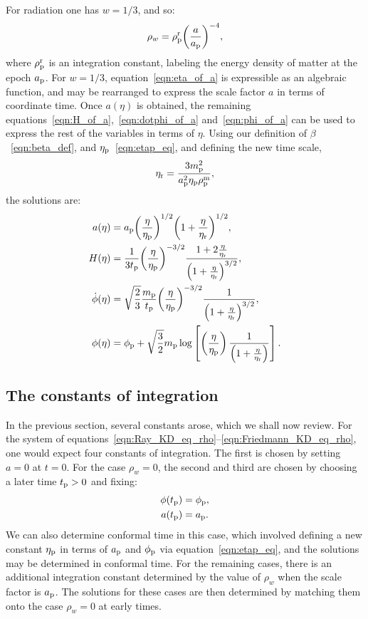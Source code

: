 For radiation one has \(w=1/3\), and so:
%
\begin{equation}
  \rho_w = \rho_{\mathrm{p}}^{\mathrm{r}}{\left(\frac{a}{a_{\mathrm{p}}}\right)}^{-4},
\end{equation}
%
where \(\rho_{\mathrm{p}}^{\mathrm{r}}\) is an integration constant, labeling the energy density of matter at the epoch \(a_{\mathrm{p}}\).  For \(w=1/3\), equation~\eqref{eqn:eta_of_a} is expressible as an algebraic function, and may be rearranged to express the scale factor \(a\) in terms of coordinate time. Once \(a(\eta)\) is obtained, the remaining equations~\eqref{eqn:H_of_a},~\eqref{eqn:dotphi_of_a} and~\eqref{eqn:phi_of_a} can be used to express the rest of the variables in terms of \(\eta\). Using our definition of \(\beta\)~\eqref{eqn:beta_def}, and \(\eta_{\mathrm{p}}\)~\eqref{eqn:etap_eq}, and defining the new time scale,
%
\begin{equation}
  \eta_{\mathrm{r}} = \frac{3m_{\mathrm{p}}^2}{a_{\mathrm{p}}^2\eta_{\mathrm{p}}\rho_{\mathrm{p}}^{\mathrm{m}}},
  \label{eqn:etar}
\end{equation}
%
the solutions are:
%
\begin{align}
  a(\eta)
  &=
  a_{\mathrm{p}}{\left(\frac{\eta}{\eta_{\mathrm{p}}}\right)}^{1/2}
  {\left({1+\frac{\eta}{\eta_{\mathrm{r}}}}\right)}^{1/2},
  \\
  H(\eta) 
  &= 
  \frac{1}{3t_{\mathrm{p}}}{\left(\frac{\eta}{\eta_{\mathrm{p}}}\right)}^{-3/2}
  \frac{1+ 2\frac{\eta}{\eta_{\mathrm{r}}}}
  {{\left(1+ \frac{\eta}{\eta_{\mathrm{r}}}\right)}^{3/2}},
  \\
  \dot{\phi}(\eta) 
  &=
  \sqrt{\frac{2}{3}}\frac{m_{\mathrm{p}}}{t_{\mathrm{p}}}
  {\left(\frac{\eta}{\eta_{\mathrm{p}}}\right)}^{-3/2}
  \frac{1}{{\left(1+ \frac{\eta}{\eta_{\mathrm{r}}}\right)}^{3/2}},
  \\ 
  \phi(\eta) 
  &=
  \phi_{\mathrm{p}}+\sqrt {\frac{3}{2}}m_{\mathrm{p}}\log  
  \left[
  \left(\frac{\eta}{\eta_{\mathrm{p}}}\right)
  \frac {1}{\left(1+ \frac{\eta}{\eta_{\mathrm{r}}}\right)} 
  \right].
\end{align}
%

\subsection{The constants of integration}
\label{sec:constants}
In the previous section, several constants arose, which we shall now review. For the system of equations~\eqref{eqn:Ray_KD_eq_rho}--\eqref{eqn:Friedmann_KD_eq_rho}, one would expect four constants of integration. The first is chosen by setting \(a=0\) at \(t=0\). For the case \(\rho_w=0\), the second and third are chosen by choosing a later time \(t_{\mathrm{p}}>0\) and fixing:
%
\begin{align}
  \phi(t_{\mathrm{p}}) &= \phi_{\mathrm{p}}, \nonumber\\
  a(t_{\mathrm{p}}) &= a_{\mathrm{p}}. \nonumber
\end{align}
%
We can also determine conformal time in this case, which involved defining a new constant \(\eta_{\mathrm{p}}\) in terms of \(a_{\mathrm{p}}\) and \(\phi_{\mathrm{p}}\) via equation~\eqref{eqn:etap_eq}, and the solutions may be determined in conformal time. For the remaining cases, there is an additional integration constant determined by the value of \(\rho_w\) when the scale factor is \(a_{\mathrm{p}}\). The solutions for these cases are then determined by matching them onto the case \(\rho_w=0\) at early times.

